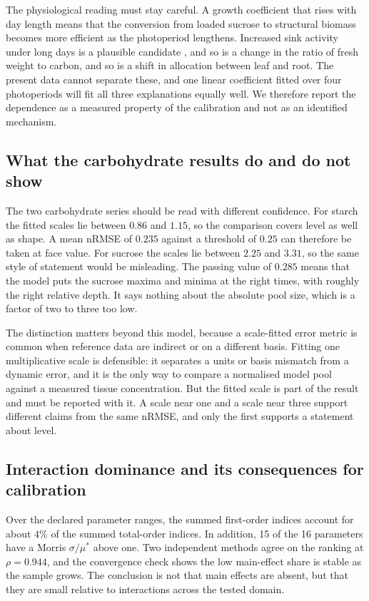 The physiological reading must stay careful. A growth coefficient that rises
with day length means that the conversion from loaded sucrose to structural
biomass becomes more efficient as the photoperiod lengthens. Increased sink
activity under long days is a plausible candidate \citep{Smith2007,Sulpice2014},
and so is a change in the ratio of fresh weight to carbon, and so is a shift in
allocation between leaf and root. The present data cannot separate these, and
one linear coefficient fitted over four photoperiods will fit all three
explanations equally well. We therefore report the dependence as a measured
property of the calibration and not as an identified mechanism.

\subsection{What the carbohydrate results do and do not show}

The two carbohydrate series should be read with different confidence. For starch
the fitted scales lie between $0.86$ and $1.15$, so the comparison covers level
as well as shape. A mean nRMSE of $0.235$ against a threshold of $0.25$ can
therefore be taken at face value. For sucrose the scales lie between $2.25$ and $3.31$, so
the same style of statement would be misleading. The passing value of $0.285$
means that the model puts the sucrose maxima and minima at the right times, with
roughly the right relative depth. It says nothing about the absolute pool size,
which is a factor of two to three too low.

The distinction matters beyond this model, because a scale-fitted error metric
is common when reference data are indirect or on a different basis. Fitting one
multiplicative scale is defensible: it separates a units or basis mismatch from a
dynamic error, and it is the only way to compare a normalised model pool against
a measured tissue concentration. But the fitted scale is part of the result and
must be reported with it. A scale near one and a scale near three support
different claims from the same nRMSE, and only the first supports a statement
about level.

\subsection{Interaction dominance and its consequences for calibration}

Over the declared parameter ranges, the summed first-order indices account for
about $4\%$ of the summed total-order indices. In addition, 15 of the 16
parameters have a Morris $\sigma/\mu^{*}$ above one. Two independent methods
agree on the ranking at $\rho = 0.944$, and the convergence check shows the low
main-effect share is stable as the sample grows. The
conclusion is not that main effects are absent, but that they are small
relative to interactions across the tested domain.

